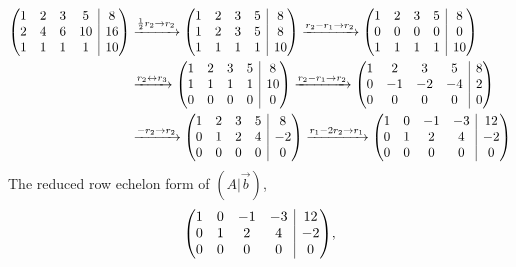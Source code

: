 \documentclass[12pt]{article}
\makeatletter
\newenvironment{amatrix}[1]{%
  \left(\begin{array}{@{}*{#1}{c}|c@{}}
}{%
  \end{array}\right)
}
\makeatother
\begin{document}
\begin{align*}
	\begin{amatrix}{4}
		1 & 2 & 3 & 5 & 8 \\
		2 & 4 & 6 & 10 & 16 \\
		1 & 1 & 1 & 1 & 10
	\end{amatrix}
	&\xrightarrow{\frac{1}{2}r_2 \rightarrow r_2}
	\begin{amatrix}{4}
		1 & 2 & 3 & 5 & 8 \\
		1 & 2 & 3 & 5 & 8 \\
		1 & 1 & 1 & 1 & 10
	\end{amatrix}
	\xrightarrow{r_2 - r_1 \rightarrow r_2}
	\begin{amatrix}{4}
		1 & 2 & 3 & 5 & 8 \\
		0 & 0 & 0 & 0 & 0 \\
		1 & 1 & 1 & 1 & 10
	\end{amatrix}
	\\
	&\xrightarrow{r_2 \leftrightarrow r_3}
	\begin{amatrix}{4}
		1 & 2 & 3 & 5 & 8 \\
		1 & 1 & 1 & 1 & 10 \\
		0 & 0 & 0 & 0 & 0
	\end{amatrix}
	\xrightarrow{r_2 - r_1 \rightarrow r_2}
	\begin{amatrix}{4}
		1 & 2 & 3 & 5 & 8 \\
		0 & -1 & -2 & -4 & 2 \\
		0 & 0 & 0 & 0 & 0
	\end{amatrix}
	\\
	&\xrightarrow{-r_2 \rightarrow r_2}
	\begin{amatrix}{4}
		1 & 2 & 3 & 5 & 8 \\
		0 & 1 & 2 & 4 & -2 \\
		0 & 0 & 0 & 0 & 0
	\end{amatrix}
	\xrightarrow{r_1 - 2r_2 \rightarrow r_1}
	\begin{amatrix}{4}
		1 & 0 & -1 & -3 & 12 \\
		0 & 1 & 2 & 4 & -2 \\
		0 & 0 & 0 & 0 & 0
	\end{amatrix}
\end{align*}
\normalsize
\newpage
\noindent The reduced row echelon form of $(A|\vec{b})$,
\begin{equation*}
	\begin{amatrix}{4}
		1 & 0 & -1 & -3 & 12 \\
		0 & 1 & 2 & 4 & -2 \\
		0 & 0 & 0 & 0 & 0
	\end{amatrix}
	,
\end{equation*}
\end{document}
